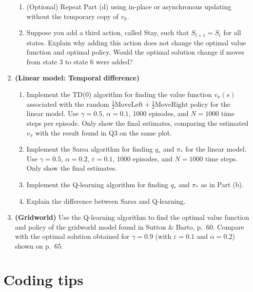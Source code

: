 \documentclass[11pt,a4paper]{article}
\newcommand{\mL}{\textrm{MoveLeft}}
\newcommand{\mR}{\textrm{MoveRight}}
\newcommand{\eps}{\varepsilon}
\newcommand{\wt}{\marginpar{[*]}}
\begin{document}
\begin{enumerate}[\bf Q1.]
\begin{enumerate}[\bf (a)]
\item (Optional) Repeat \wt Part (d) using in-place or asynchronous updating without the temporary copy of $v_k$.

\item Suppose \wt you add a third action, called Stay, such that $S_{t+1}=S_t$ for all states. Explain why adding this action does not change the optimal value function and optimal policy. Would the optimal solution change if moves from state $3$ to state $6$ were added?
\end{enumerate}

\item \textbf{(Linear model: Temporal difference)} \wt
\begin{enumerate}[\bf (a)]
\item Implement the TD(0) algorithm for finding the value function $v_\pi(s)$ associated with the random $\frac{1}{2}\mL+\frac{1}{2}\mR$ policy	 for the linear model. Use $\gamma=0.5$, $\alpha=0.1$, 1000 episodes, and $N=1000$ time steps per episode. Only show the final estimates, comparing the estimated $v_\pi$ with the result found in Q3 on the same plot. %
\item Implement the Sarsa algorithm for finding $q_*$ and $\pi_*$ for the linear model. Use $\gamma=0.5$, $\alpha=0.2$, $\eps=0.1$, 1000 episodes, and $N=1000$ time steps. Only show the final estimates. %
\item Implement the Q-learning algorithm for finding $q_*$ and $\pi_*$ as in Part (b). %
\item Explain the difference between Sarsa and Q-learning. 
\end{enumerate}

\item \textbf{(Gridworld)} \wt Use the Q-learning algorithm to find the optimal value function and policy of the gridworld model found in Sutton \& Barto, p.~60. Compare with the optimal solution obtained for $\gamma=0.9$ (with $\eps=0.1$ and $\alpha=0.2$) shown on p.~65.
\end{enumerate}

\section{Coding tips}
\end{document}
